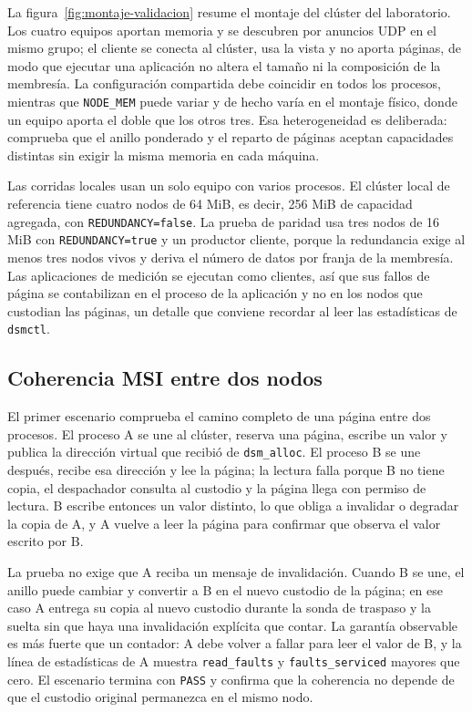 La figura~\ref{fig:montaje-validacion} resume el montaje del clúster del laboratorio. Los cuatro equipos aportan memoria y se descubren por anuncios UDP en el mismo grupo; el cliente se conecta al clúster, usa la vista y no aporta páginas, de modo que ejecutar una aplicación no altera el tamaño ni la composición de la membresía. La configuración compartida debe coincidir en todos los procesos, mientras que \texttt{NODE\_MEM} puede variar y de hecho varía en el montaje físico, donde un equipo aporta el doble que los otros tres. Esa heterogeneidad es deliberada: comprueba que el anillo ponderado y el reparto de páginas aceptan capacidades distintas sin exigir la misma memoria en cada máquina.

Las corridas locales usan un solo equipo con varios procesos. El clúster local de referencia tiene cuatro nodos de 64 MiB, es decir, 256 MiB de capacidad agregada, con \texttt{REDUNDANCY=false}. La prueba de paridad usa tres nodos de 16 MiB con \texttt{REDUNDANCY=true} y un productor cliente, porque la redundancia exige al menos tres nodos vivos y deriva el número de datos por franja de la membresía. Las aplicaciones de medición se ejecutan como clientes, así que sus fallos de página se contabilizan en el proceso de la aplicación y no en los nodos que custodian las páginas, un detalle que conviene recordar al leer las estadísticas de \texttt{dsmctl}.

\subsection{Coherencia MSI entre dos nodos}

El primer escenario comprueba el camino completo de una página entre dos procesos. El proceso A se une al clúster, reserva una página, escribe un valor y publica la dirección virtual que recibió de \texttt{dsm\_alloc}. El proceso B se une después, recibe esa dirección y lee la página; la lectura falla porque B no tiene copia, el despachador consulta al custodio y la página llega con permiso de lectura. B escribe entonces un valor distinto, lo que obliga a invalidar o degradar la copia de A, y A vuelve a leer la página para confirmar que observa el valor escrito por B.

La prueba no exige que A reciba un mensaje de invalidación. Cuando B se une, el anillo puede cambiar y convertir a B en el nuevo custodio de la página; en ese caso A entrega su copia al nuevo custodio durante la sonda de traspaso y la suelta sin que haya una invalidación explícita que contar. La garantía observable es más fuerte que un contador: A debe volver a fallar para leer el valor de B, y la línea de estadísticas de A muestra \texttt{read\_faults} y \texttt{faults\_serviced} mayores que cero. El escenario termina con \texttt{PASS} y confirma que la coherencia no depende de que el custodio original permanezca en el mismo nodo.

